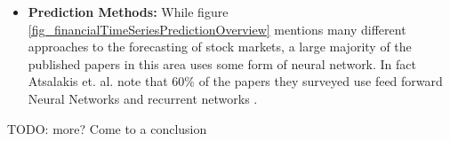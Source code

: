 \begin{itemize}
	\item \textbf{Prediction Methods:} While figure \ref{fig_financialTimeSeriesPredictionOverview} mentions many different approaches to the forecasting of stock markets, a large majority of the published papers in this area uses some form of neural network. In fact Atsalakis et. al. note that 60\% of the papers they surveyed use feed forward Neural Networks and recurrent networks \cite{atsalakis2009surveying}. 
\end{itemize}

TODO: more? Come to a conclusion


